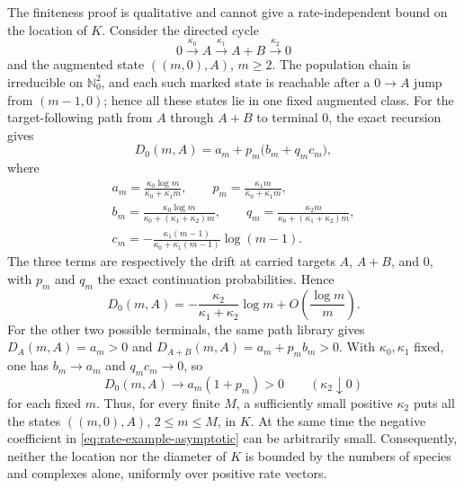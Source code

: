 \begin{remark}\label{rem:rate-dependence}
The finiteness proof is qualitative and cannot give a rate-independent bound
on the location of \(K\).  Consider the directed cycle
\[
 0\xrightarrow{\kappa_0}A
 \xrightarrow{\kappa_1}A+B
 \xrightarrow{\kappa_2}0
\]
and the augmented state \(((m,0),A)\), \(m\ge2\).  The population chain is
irreducible on \(\mathbb N_0^2\), and each such marked state is reachable
after a \(0\to A\) jump from \((m-1,0)\); hence all these states lie in one
fixed augmented class.  For the target-following path from \(A\) through
\(A+B\) to terminal \(0\), the exact recursion gives
\begin{equation}\label{eq:rate-example}
 D_0(m,A)=a_m+p_m\bigl(b_m+q_mc_m\bigr),
\end{equation}
where
\[
\begin{gathered}
 a_m=\frac{\kappa_0\log m}{\kappa_0+\kappa_1m},\qquad
 p_m=\frac{\kappa_1m}{\kappa_0+\kappa_1m},\\
 b_m=\frac{\kappa_0\log m}{\kappa_0+(\kappa_1+\kappa_2)m},\qquad
 q_m=\frac{\kappa_2m}{\kappa_0+(\kappa_1+\kappa_2)m},\\
 c_m=-\frac{\kappa_1(m-1)}{\kappa_0+\kappa_1(m-1)}\log(m-1).
\end{gathered}
\]
The three terms are respectively the drift at carried targets \(A\),
\(A+B\), and \(0\), with \(p_m\) and \(q_m\) the exact continuation
probabilities.  Hence
\begin{equation}\label{eq:rate-example-asymptotic}
 D_0(m,A)=-\frac{\kappa_2}{\kappa_1+\kappa_2}\log m
 +O\!\left(\frac{\log m}{m}\right).
\end{equation}
For the other two possible terminals, the same path library gives
\(D_A(m,A)=a_m>0\) and
\(D_{A+B}(m,A)=a_m+p_mb_m>0\).  With \(\kappa_0,\kappa_1\) fixed,
one has \(b_m\to a_m\) and \(q_mc_m\to0\), so
\begin{equation}\label{eq:rate-example-limit}
  D_0(m,A)\longrightarrow a_m(1+p_m)>0
  \qquad(\kappa_2\downarrow0)
\end{equation}
for each fixed \(m\).  Thus, for every finite
\(M\), a sufficiently small positive \(\kappa_2\) puts all the states
\(((m,0),A)\), \(2\le m\le M\), in \(K\).  At the same time the negative
coefficient in \eqref{eq:rate-example-asymptotic} can be arbitrarily small.
Consequently, neither the location nor the diameter of \(K\) is bounded by the
numbers of species and complexes alone, uniformly over positive rate vectors.
\end{remark}

